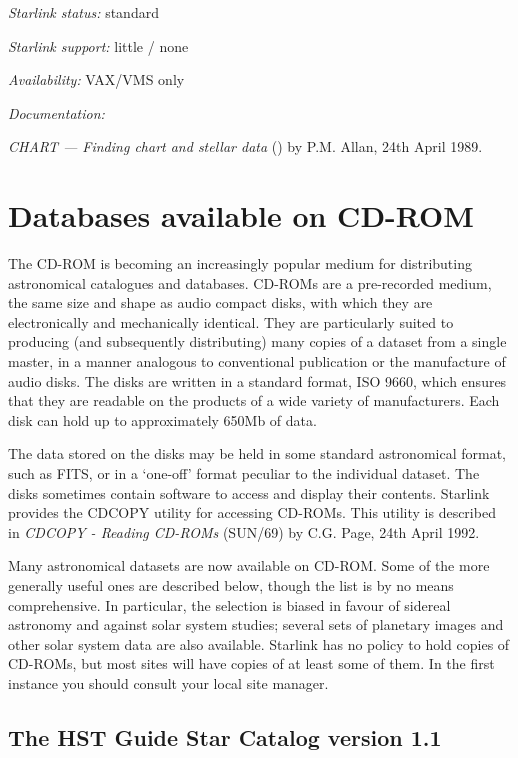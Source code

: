 {\it Starlink status:} standard

{\it Starlink support:} little / none

{\it Availability:} VAX/VMS only

{\it Documentation:}

{\it CHART --- Finding chart and stellar data}
() by P.M. Allan,
24th April 1989.


\section{Databases available on CD-ROM
}

The CD-ROM is becoming an increasingly popular medium for distributing 
astronomical catalogues and databases. CD-ROMs are a pre-recorded
medium, the same size and shape as audio compact disks, with which they 
are electronically and mechanically identical. They are particularly 
suited to producing (and subsequently distributing) many copies of a 
dataset from a single master, in a manner analogous to conventional 
publication or the manufacture of audio disks. The disks are written 
in a standard format, ISO 9660, which ensures that they are readable 
on the products of a wide variety of manufacturers. Each disk can hold 
up to approximately 650Mb of data.

The data stored on the disks may be held in some standard astronomical 
format, such as FITS, or in a `one-off' format peculiar to the
individual dataset. The disks sometimes contain software to access and
display their contents. Starlink provides the CDCOPY utility for 
accessing CD-ROMs. This utility is described in {\it CDCOPY - Reading 
CD-ROMs}
(SUN/69) by C.G. Page, 24th April 1992.

Many astronomical datasets are now available on CD-ROM. Some of the more
generally useful ones are described below, though the list is by no 
means comprehensive. In particular, the selection is biased in favour of
sidereal astronomy and against solar system studies; several sets of 
planetary images and other solar system data are also available. 
Starlink has no policy to hold copies of CD-ROMs, but most sites will
have copies of at least some of them. In the first instance you should
consult your local site manager.

\subsection{The HST Guide Star Catalog version 1.1
\label{GSC}}

